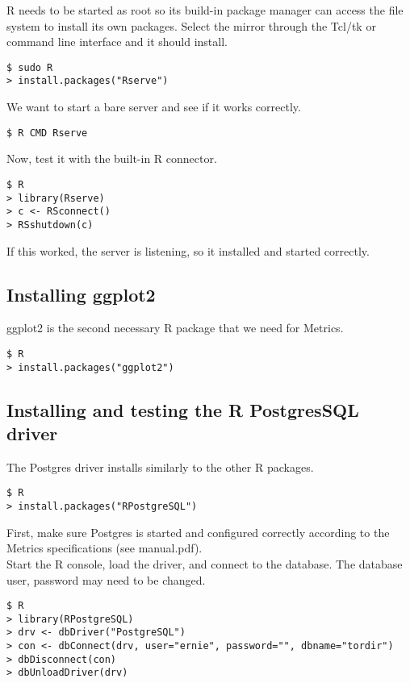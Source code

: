 \documentclass{article}
\begin{document}
R needs to be started as root so its build-in package manager can access
the file system to install its own packages. Select the mirror through the
Tcl/tk or command line interface and it should install.

\begin{verbatim}
$ sudo R
> install.packages("Rserve")
\end{verbatim}

We want to start a bare server and see if it works correctly.

\begin{verbatim}
$ R CMD Rserve
\end{verbatim}

Now, test it with the built-in R connector.

\begin{verbatim}
$ R
> library(Rserve)
> c <- RSconnect()
> RSshutdown(c)
\end{verbatim}

If this worked, the server is listening, so it installed and started
correctly.

\subsection{Installing ggplot2}
ggplot2 is the second necessary R package that we need for Metrics.

\begin{verbatim}
$ R
> install.packages("ggplot2")
\end{verbatim}

\subsection{Installing and testing the R PostgresSQL driver}
The Postgres driver installs similarly to the other R packages.

\begin{verbatim}
$ R
> install.packages("RPostgreSQL")
\end{verbatim}

First, make sure Postgres is started and configured correctly according to
the Metrics specifications (see manual.pdf).
\\

Start the R console, load the driver, and connect to the database. The
database user, password may need to be changed.
\begin{verbatim}
$ R
> library(RPostgreSQL)
> drv <- dbDriver("PostgreSQL")
> con <- dbConnect(drv, user="ernie", password="", dbname="tordir")
> dbDisconnect(con)
> dbUnloadDriver(drv)
\end{verbatim}
\end{document}
